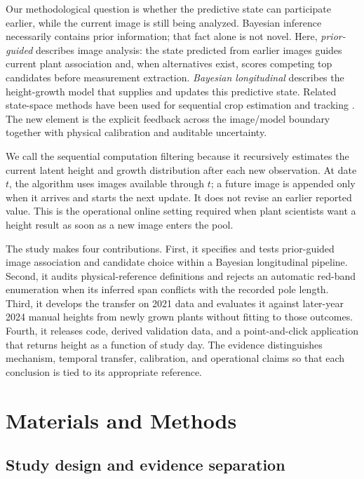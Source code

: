 \documentclass[review,12pt,authoryear]{elsarticle}
\begin{document}
Our methodological question is whether the predictive state can participate earlier, while the current image is still being analyzed. Bayesian inference necessarily contains prior information; that fact alone is not novel. Here, \emph{prior-guided} describes image analysis: the state predicted from earlier images guides current plant association and, when alternatives exist, scores competing top candidates before measurement extraction. \emph{Bayesian longitudinal} describes the height-growth model that supplies and updates this predictive state. Related state-space methods have been used for sequential crop estimation and tracking \cite{gordon1993particle,west1997bayesian,durbin2012time,yang2022ricepf,li2022kalman,shimda2026bayesianheight}. The new element is the explicit feedback across the image/model boundary together with physical calibration and auditable uncertainty.

We call the sequential computation filtering because it recursively estimates the current latent height and growth distribution after each new observation. At date $t$, the algorithm uses images available through $t$; a future image is appended only when it arrives and starts the next update. It does not revise an earlier reported value. This is the operational online setting required when plant scientists want a height result as soon as a new image enters the pool.

The study makes four contributions. First, it specifies and tests prior-guided image association and candidate choice within a Bayesian longitudinal pipeline. Second, it audits physical-reference definitions and rejects an automatic red-band enumeration when its inferred span conflicts with the recorded pole length. Third, it develops the transfer on 2021 data and evaluates it against later-year 2024 manual heights from newly grown plants without fitting to those outcomes. Fourth, it releases code, derived validation data, and a point-and-click application that returns height as a function of study day. The evidence distinguishes mechanism, temporal transfer, calibration, and operational claims so that each conclusion is tied to its appropriate reference.

\section{Materials and Methods}

\subsection{Study design and evidence separation}
\end{document}
